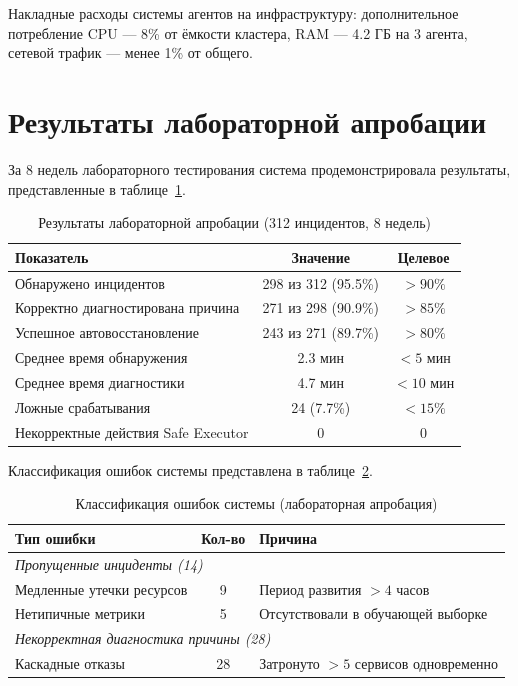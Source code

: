 Накладные расходы системы агентов на инфраструктуру: дополнительное потребление CPU --- 8\% от ёмкости кластера, RAM --- 4.2 ГБ на 3 агента, сетевой трафик --- менее 1\% от общего.

\section{Результаты лабораторной апробации}

За 8 недель лабораторного тестирования система продемонстрировала результаты, представленные в таблице~\ref{tab:lab_aprobation_results}.

\begin{table}[H]
\centering
\caption{Результаты лабораторной апробации (312 инцидентов, 8 недель)}
\label{tab:lab_aprobation_results}
\begin{tabular}{|p{5cm}|c|c|}
\hline
\textbf{Показатель} & \textbf{Значение} & \textbf{Целевое} \\
\hline
Обнаружено инцидентов & 298 из 312 (95.5\%) & $> 90\%$ \\
\hline
Корректно диагностирована причина & 271 из 298 (90.9\%) & $> 85\%$ \\
\hline
Успешное автовосстановление & 243 из 271 (89.7\%) & $> 80\%$ \\
\hline
Среднее время обнаружения & 2.3 мин & $< 5$ мин \\
\hline
Среднее время диагностики & 4.7 мин & $< 10$ мин \\
\hline
Ложные срабатывания & 24 (7.7\%) & $< 15\%$ \\
\hline
Некорректные действия Safe Executor & 0 & 0 \\
\hline
\end{tabular}
\end{table}

Классификация ошибок системы представлена в таблице~\ref{tab:error_breakdown}.

\begin{table}[H]
\centering
\caption{Классификация ошибок системы (лабораторная апробация)}
\label{tab:error_breakdown}
\begin{tabular}{|p{3.5cm}|c|p{6cm}|}
\hline
\textbf{Тип ошибки} & \textbf{Кол-во} & \textbf{Причина} \\
\hline
\multicolumn{3}{|l|}{\textit{Пропущенные инциденты (14)}} \\
\hline
Медленные утечки ресурсов & 9 & Период развития $> 4$ часов \\
\hline
Нетипичные метрики & 5 & Отсутствовали в обучающей выборке \\
\hline
\multicolumn{3}{|l|}{\textit{Некорректная диагностика причины (28)}} \\
\hline
Каскадные отказы & 28 & Затронуто $> 5$ сервисов одновременно \\
\hline
\end{tabular}
\end{table}

